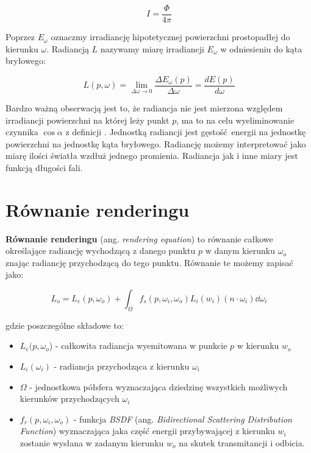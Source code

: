 \documentclass[../main.tex]{subfiles}
\begin{document}
\[
  I = \frac{\Phi}{4\pi}
\]

Poprzez $E_{\omega}$ oznaczmy irradiancję hipotetycznej powierzchni
prostopadłej do kierunku $\omega$. Radiancją $L$ nazywamy miarę irradiancji
$E_{\omega}$ w odniesieniu do kąta bryłowego:

$$
L(p, \omega) = \lim_{\Delta\omega \rightarrow 0} {
  \frac{\Delta E_{\omega} (p)}{\Delta\omega}
} =
\frac{d E(p)}{d \omega}
$$

Bardzo ważną obserwacją jest to, że radiancja nie jest mierzona względem
irradiancji powierzchni na której leży punkt $p$, ma to na celu wyeliminowanie
czynnika $\cos \alpha$ z definicji \cite[p. 339]{pbrt}. Jednostką radiancji
jest gęstość energii na jednostkę powierzchni na jednostkę kąta bryłowego.
Radiancję możemy interpretować jako miarę ilości światła wzdłuż jednego
promienia. Radiancja jak i inne miary jest funkcją długości fali.

\section{Równanie renderingu}

\textbf{Równanie renderingu} (ang. \textit{rendering equation}) to równanie
całkowe określające radiancję wychodzącą z danego punktu $p$ w danym kierunku
$\omega_o$ znając radiancję przychodzącą do tego punktu. Równanie te możemy
zapisać jako:

\[
  L_o =
  L_{e}(p, \omega_o) +
  \int_{\Omega} {
    f_s(p, \omega_i, \omega_o)
    L_i(w_i)
    (n \cdot \omega_i)
    \dd{\omega_i}
  }
\]

\noindent gdzie poszczególne składowe to:

\begin{itemize}

  \item $L_e(p, \omega_o$) - całkowita radiancja wyemitowana  w punkcie $p$ w
    kierunku $w_o$

  \item $L_i(\omega_i)$ - radiancja przychodząca z kierunku $\omega_i$

  \item $\Omega$ - jednostkowa półsfera wyznaczająca dziedzinę wszystkich
    możliwych kierunków przychodzących $\omega_i$

  \item $f_{r}(p, \omega_i, \omega_o)$ - funkcja \textit{BSDF} (ang.
    \textit{Bidirectional Scattering Distribution Function}) wyznaczająca jaka
    część energii przybywającej z kierunku $w_i$ zostanie wysłana w zadanym
    kierunku $w_o$ na skutek transmitancji i odbicia.

\end{itemize}
\end{document}
